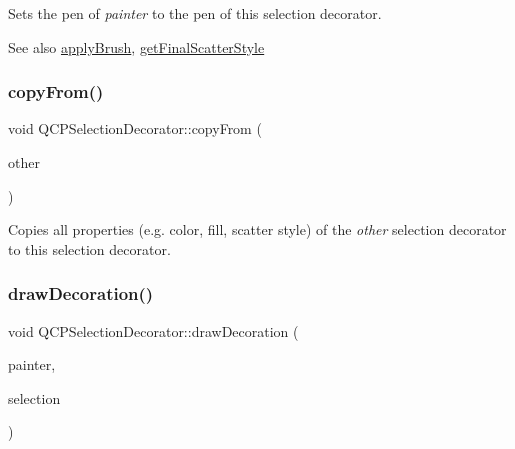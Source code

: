 Sets the pen of {\itshape painter} to the pen of this selection decorator.

\begin{DoxySeeAlso}{See also}
\hyperlink{classQCPSelectionDecorator_a225544527d51b49546b70d0e6d655a34}{apply\+Brush}, \hyperlink{classQCPSelectionDecorator_a1277b373248896bc70e8cc1de96da9fa}{get\+Final\+Scatter\+Style} 
\end{DoxySeeAlso}
\mbox{\label{classQCPSelectionDecorator_a467a8d5cfcab27e862a17c797ac27b8a}} 
\subsubsection{\texorpdfstring{copy\+From()}{copyFrom()}}
{\footnotesize\ttfamily void Q\+C\+P\+Selection\+Decorator\+::copy\+From (\begin{DoxyParamCaption}\item[{const \hyperlink{classQCPSelectionDecorator}{Q\+C\+P\+Selection\+Decorator} $\ast$}]{other }\end{DoxyParamCaption})\hspace{0.3cm}{\ttfamily [virtual]}}

Copies all properties (e.\+g. color, fill, scatter style) of the {\itshape other} selection decorator to this selection decorator. \mbox{\label{classQCPSelectionDecorator_a4f8eb49e277063845391e803ae23054a}} 
\subsubsection{\texorpdfstring{draw\+Decoration()}{drawDecoration()}}
{\footnotesize\ttfamily void Q\+C\+P\+Selection\+Decorator\+::draw\+Decoration (\begin{DoxyParamCaption}\item[{\hyperlink{classQCPPainter}{Q\+C\+P\+Painter} $\ast$}]{painter,  }\item[{\hyperlink{classQCPDataSelection}{Q\+C\+P\+Data\+Selection}}]{selection }\end{DoxyParamCaption})\hspace{0.3cm}{\ttfamily [virtual]}}

